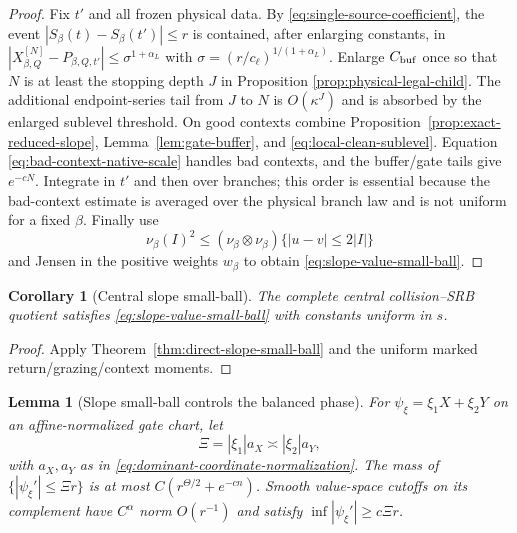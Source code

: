 \documentclass[11pt]{article}
\newtheorem{lemma}[theorem]{Lemma}
\newtheorem{corollary}[theorem]{Corollary}
\begin{document}
\begin{proof}
Fix $t'$ and all frozen physical data.  By
\eqref{eq:single-source-coefficient}, the event
$|S_\beta(t)-S_\beta(t')|\le r$ is contained, after enlarging constants, in
 $|X^{[N]}_{\beta,Q}-P_{\beta,Q,t'}|\le\sigma^{1+\alpha_L}$ with
$\sigma=(r/c_\ell)^{1/(1+\alpha_L)}$.  Enlarge $C_{\rm buf}$ once so that
$N$ is at least the stopping depth $J$ in Proposition
\ref{prop:physical-legal-child}.  The additional endpoint-series tail from
$J$ to $N$ is $O(\kappa^J)$ and is absorbed by the enlarged sublevel
threshold.  On good contexts combine
Proposition~\ref{prop:exact-reduced-slope}, Lemma~\ref{lem:gate-buffer}, and
\eqref{eq:local-clean-sublevel}.  Equation \eqref{eq:bad-context-native-scale}
handles bad contexts, and the buffer/gate tails give $e^{-cN}$.  Integrate in
$t'$ and then over branches; this order is essential because the bad-context
estimate is averaged over the physical branch law and is not uniform for a
fixed $\beta$.  Finally use
\[
 \nu_\beta(I)^2\le
 (\nu_\beta\otimes\nu_\beta)\{|u-v|\le2|I|\}
\]
and Jensen in the positive weights $w_\beta$ to obtain
\eqref{eq:slope-value-small-ball}.
\end{proof}

\begin{corollary}[Central slope small-ball]
\label{cor:central-g2}
The complete central collision--SRB quotient satisfies
\eqref{eq:slope-value-small-ball} with constants uniform in $s$.
\end{corollary}

\begin{proof}
Apply Theorem~\ref{thm:direct-slope-small-ball} and the uniform marked
return/grazing/context moments.
\end{proof}

\begin{lemma}[Slope small-ball controls the balanced phase]
\label{lem:slope-good-bad-phase}
For $\psi_\xi=\xi_1X+\xi_2Y$ on an affine-normalized gate chart, let
\begin{equation}
\label{eq:balanced-physical-frequency}
 \Xi=|\xi_1|a_X\asymp|\xi_2|a_Y,
\end{equation}
with $a_X,a_Y$ as in \eqref{eq:dominant-coordinate-normalization}.  The mass of
$\{|\psi_\xi'|\le\Xi r\}$ is at most
 $C(r^{\Theta/2}+e^{-cn})$.  Smooth value-space cutoffs on its complement have
$C^\alpha$ norm $O(r^{-1})$ and satisfy
$\inf|\psi_\xi'|\ge c\Xi r$.
\end{lemma}
\end{document}
